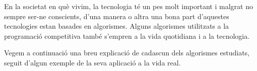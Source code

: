 







En la societat en què vivim, la tecnologia té un pes molt important i malgrat no sempre ser-ne conscients, d'una manera o altra una bona part d'aquestes tecnologies estan basades en algorismes. Alguns algorismes utilitzats a la programació competitiva també s'empren a la vida quotidiana i a la tecnologia. \newline


Vegem a continuació una breu explicació de cadascun dels algorismes estudiats, seguit d'algun exemple de la seva aplicació a la vida real. \newline

